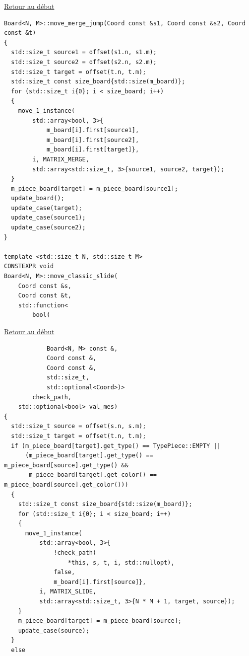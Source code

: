 {\begin{frame}[fragile]
\hyperlink{conclusion}{Retour au début}\newline
\begin{verbatim}
Board<N, M>::move_merge_jump(Coord const &s1, Coord const &s2, Coord const &t)
{
  std::size_t source1 = offset(s1.n, s1.m);
  std::size_t source2 = offset(s2.n, s2.m);
  std::size_t target = offset(t.n, t.m);
  std::size_t const size_board{std::size(m_board)};
  for (std::size_t i{0}; i < size_board; i++)
  {
    move_1_instance(
        std::array<bool, 3>{
            m_board[i].first[source1],
            m_board[i].first[source2],
            m_board[i].first[target]},
        i, MATRIX_MERGE,
        std::array<std::size_t, 3>{source1, source2, target});
  }
  m_piece_board[target] = m_piece_board[source1];
  update_board();
  update_case(target);
  update_case(source1);
  update_case(source2);
}

template <std::size_t N, std::size_t M>
CONSTEXPR void
Board<N, M>::move_classic_slide(
    Coord const &s,
    Coord const &t,
    std::function<
        bool(
\end{verbatim}
\end{frame}

\begin{frame}[fragile]
\hyperlink{conclusion}{Retour au début}\newline
\begin{verbatim}
            Board<N, M> const &,
            Coord const &,
            Coord const &,
            std::size_t,
            std::optional<Coord>)>
        check_path,
    std::optional<bool> val_mes)
{
  std::size_t source = offset(s.n, s.m);
  std::size_t target = offset(t.n, t.m);
  if (m_piece_board[target].get_type() == TypePiece::EMPTY ||
      (m_piece_board[target].get_type() == m_piece_board[source].get_type() &&
       m_piece_board[target].get_color() == m_piece_board[source].get_color()))
  {
    std::size_t const size_board{std::size(m_board)};
    for (std::size_t i{0}; i < size_board; i++)
    {
      move_1_instance(
          std::array<bool, 3>{
              !check_path(
                  *this, s, t, i, std::nullopt),
              false,
              m_board[i].first[source]},
          i, MATRIX_SLIDE,
          std::array<std::size_t, 3>{N * M + 1, target, source});
    }
    m_piece_board[target] = m_piece_board[source];
    update_case(source);
  }
  else
\end{verbatim}
\end{frame}

}

